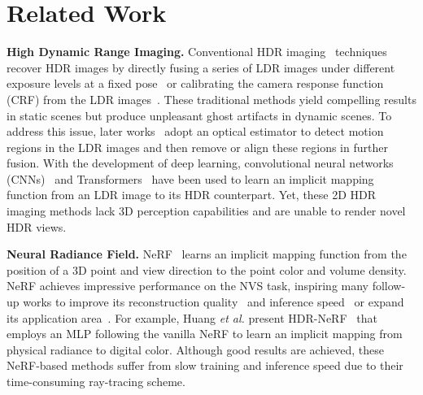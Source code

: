 \documentclass{article}
\begin{document}
\section{Related Work}

\noindent\textbf{High Dynamic Range Imaging.} Conventional HDR imaging~\cite{szeliski2022computer} techniques recover HDR images by directly fusing a series of LDR images under different exposure levels at a fixed pose~\cite{exposure_fusion} or calibrating the camera response function (CRF) from the LDR images~\cite{malik, ward2008high}. These traditional methods yield compelling results in static scenes but produce unpleasant ghost artifacts in dynamic scenes. To address this issue, later works~\cite{hdr_20,hdr_24,hdr_26,hdr_58,hdr_63} adopt an optical estimator to detect motion regions in the LDR images and then remove or align these regions in further fusion. With the development of deep learning, convolutional neural networks (CNNs)~\cite{hdr_cnn_1,hdr_cnn_2,hdr_cnn_3,hdr_cnn_4} and Transformers~\cite{hdr_trans_1,hdr_trans_2,hdr_trans_3, neural_gaffer,magic,promptfix} have been used to learn an implicit mapping function from an LDR image to its HDR counterpart. Yet, these 2D HDR imaging methods lack 3D perception capabilities and are unable to render novel HDR views.

\vspace{1mm}
\noindent\textbf{Neural Radiance Field.} NeRF~\cite{nerf} learns an implicit mapping function from the position of a 3D point and view direction to the point color and volume density. NeRF achieves impressive performance on the NVS task, inspiring many follow-up works to improve its reconstruction quality~\cite{mip_nerf,mipnerf360,refnerf,trimiprf,zipnerf} and inference speed~\cite{instant_ngp,merf,tensorf,nerfacc,bakedsdf,mobilenerf,EfficientNeRF} or expand its application area~\cite{hdr_nerf,aleth_nerf,sax_nerf,deblur_nerf,denoise_nerf}. For example, Huang \emph{et al.} present HDR-NeRF~\cite{hdr_nerf} that employs an MLP following the vanilla NeRF to learn an implicit mapping from physical radiance to digital color. Although good results are achieved, these NeRF-based methods suffer from slow training and inference speed due to their time-consuming ray-tracing scheme.
\end{document}
